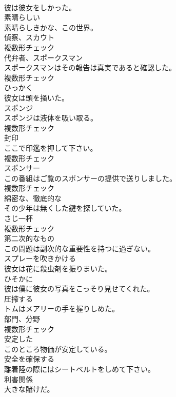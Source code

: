 \documentclass[8pt]{extreport}
\begin{document}
\begin{CJK}{UTF8}{min}
\\	彼は彼女をしかった。	
\\	[形容詞]	素晴らしい	
\\	素晴らしきかな、この世界。	
\\	[名詞]	偵察、スカウト	
\\	複数形チェック
\\	[名詞]	代弁者、スポークスマン	
\\	スポークスマンはその報告は真実であると確認した。	
\\	複数形チェック
\\	[動詞]	ひっかく	
\\	彼女は頭を掻いた。	
\\	[名詞]	スポンジ	
\\	スポンジは液体を吸い取る。	
\\	複数形チェック
\\	[名詞]	封印	
\\	ここで印鑑を押して下さい。	
\\	複数形チェック
\\	[名詞]	スポンサー	
\\	この番組はご覧のスポンサーの提供で送りしました。	
\\	複数形チェック
\\	[形容詞]	綿密な、徹底的な	
\\	その少年は無くした鍵を探していた。	
\\	[名詞]	さじ一杯	
\\	複数形チェック
\\	[形容詞]	第二次的なもの	
\\	この問題は副次的な重要性を持つに過ぎない。	
\\	[動詞]	スプレーを吹きかける	
\\	彼女は花に殺虫剤を振りまいた。	
\\	[副詞]	ひそかに	
\\	彼は僕に彼女の写真をこっそり見せてくれた。	
\\	[動詞]	圧搾する	
\\	トムはメアリーの手を握りしめた。	
\\	[名詞]	部門、分野	
\\	複数形チェック
\\	[形容詞]	安定した	
\\	このところ物価が安定している。	
\\	[動詞]	安全を確保する	
\\	離着陸の際にはシートベルトをしめて下さい。	
\\	[名詞]	利害関係	
\\	大きな賭けだ。	

\end{CJK}
\end{document}
